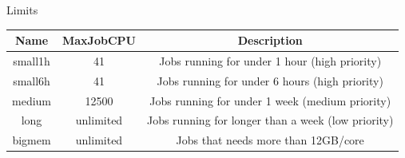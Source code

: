 \documentclass[final,t]{beamer}
\begin{document}
\begin{frame}[fragile]{}
\begin{columns}[t]
\begin{column}{.32\linewidth}
      \begin{block}{Limits}
        \vspace*{-2ex}
      \begin{center}
      \begin{tabular}{|c|c|c|}
      \hline 
      \textbf{Name} & \textbf{MaxJobCPU} & \textbf{Description} \\ 
      \hline 
      small1h & 41 &  Jobs running for under 1 hour (high priority)\\ 
      \hline 
      small6h & 41 & Jobs running for under 6 hours  (high priority)\\ 
      \hline 
      medium & 12500 &  Jobs running for under 1 week  (medium priority)\\ 
      \hline 
      long & unlimited &  Jobs running for longer than a week  (low priority)\\ 
      \hline 
      bigmem & unlimited &  Jobs that needs more than 12GB/core\\ 
      \hline 
      \end{tabular} 
      \end{center}
        \vspace*{-2ex}
      \end{block}

     \end{column}

    

\end{columns}
\end{frame}
\end{document}
